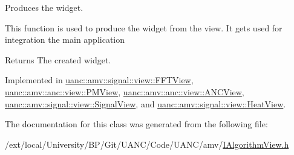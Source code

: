 Produces the widget. 

This function is used to produce the widget from the view. It gets used for integration the main application

\begin{DoxyReturn}{Returns}
The created widget. 
\end{DoxyReturn}


Implemented in \hyperlink{classuanc_1_1amv_1_1signal_1_1view_1_1_f_f_t_view_a774599a51059f878472cf72e2ce4b2b2}{uanc\+::amv\+::signal\+::view\+::\+F\+F\+T\+View}, \hyperlink{classuanc_1_1amv_1_1anc_1_1view_1_1_p_m_view_a4f4d6f52427201d7dcd671c7932824ad}{uanc\+::amv\+::anc\+::view\+::\+P\+M\+View}, \hyperlink{classuanc_1_1amv_1_1anc_1_1view_1_1_a_n_c_view_ab8ad6046c26c2eae15edc82fdbae9aa1}{uanc\+::amv\+::anc\+::view\+::\+A\+N\+C\+View}, \hyperlink{classuanc_1_1amv_1_1signal_1_1view_1_1_signal_view_a8b42dd84baf3c0730640ddb87db69735}{uanc\+::amv\+::signal\+::view\+::\+Signal\+View}, and \hyperlink{classuanc_1_1amv_1_1signal_1_1view_1_1_heat_view_a93ac20354fa17ab67e368e324f240c9a}{uanc\+::amv\+::signal\+::view\+::\+Heat\+View}.



The documentation for this class was generated from the following file\+:\begin{DoxyCompactItemize}
\item 
/ext/local/\+University/\+B\+P/\+Git/\+U\+A\+N\+C/\+Code/\+U\+A\+N\+C/amv/\hyperlink{_i_algorithm_view_8h}{I\+Algorithm\+View.\+h}\end{DoxyCompactItemize}
